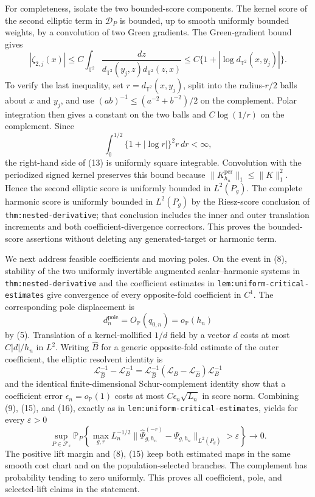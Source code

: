 For completeness, isolate the two bounded-score components.  The kernel score of the second elliptic term in \(\mathcal D_P\) is bounded, up to smooth uniformly bounded weights, by a convolution of two Green gradients.  The Green-gradient bound gives
\[
 |\zeta_{2,j}(x)|
 \leq C\int_{\mathbb T^2}
 \frac{dz}{d_{\mathbb T^2}(y_j,z)d_{\mathbb T^2}(z,x)}
 \leq C\{1+|\log d_{\mathbb T^2}(x,y_j)|\}.
\tag{13}
\]
To verify the last inequality, set \(r=d_{\mathbb T^2}(x,y_j)\), split into the radius-\(r/2\) balls about \(x\) and \(y_j\), and use
\((ab)^{-1}\leq(a^{-2}+b^{-2})/2\) on the complement.  Polar integration then gives a constant on the two balls and \(C\log(1/r)\) on the complement.  Since
\[
 \int_0^{1/2}\{1+|\log r|\}^2r\,dr<\infty,
\tag{14}
\]
the right-hand side of (13) is uniformly square integrable.  Convolution with the periodized signed kernel preserves this bound because
\(\lVert K_{h_n}^{\mathrm{per}}\rVert_1\leq\lVert K\rVert_1^2\).  Hence the second elliptic score is uniformly bounded in \(L^2(P_g)\).  The complete harmonic score is uniformly bounded in \(L^2(P_g)\) by the Riesz-score conclusion of
\texttt{thm:nested-derivative}; that conclusion includes the inner and outer translation increments and both coefficient-divergence correctors.  This proves the bounded-score assertions without deleting any generated-target or harmonic term.

We next address feasible coefficients and moving poles.  On the event in (8), stability of the two uniformly invertible augmented scalar--harmonic systems in
\texttt{thm:nested-derivative} and the coefficient estimates in
\texttt{lem:uniform-critical-estimates} give convergence of every opposite-fold coefficient in \(C^1\).  The corresponding pole displacement is
\[
 d_n^{\mathrm{pole}}=O_{\mathbb P}(q_{0,n})=o_{\mathbb P}(h_n)
\tag{15}
\]
by (5).  Translation of a kernel-mollified \(1/d\) field by a vector \(d\) costs at most \(C|d|/h_n\) in \(L^2\).  Writing \(\widehat B\) for a generic opposite-fold estimate of the outer coefficient, the elliptic resolvent identity is
\[
 \mathcal L_{\widehat B}^{-1}-\mathcal L_B^{-1}
 =\mathcal L_{\widehat B}^{-1}
   (\mathcal L_B-\mathcal L_{\widehat B})\mathcal L_B^{-1}
\tag{16}
\]
and the identical finite-dimensional Schur-complement identity show that a coefficient error \(\epsilon_n=o_{\mathbb P}(1)\) costs at most
\(C\epsilon_n\sqrt{L_n}\) in score norm.  Combining (9), (15), and (16), exactly as in
\texttt{lem:uniform-critical-estimates}, yields for every \(\varepsilon>0\)
\[
 \sup_{P\in\mathcal F_s}\mathbb P_P\!\left\{
 \max_{g,r}L_n^{-1/2}
 \lVert\widehat\Psi_{g,h_n}^{(-r)}-\Psi_{g,h_n}\rVert_{L^2(P_g)}
 >\varepsilon\right\}\longrightarrow0.
\tag{17}
\]
The positive lift margin and (8), (15) keep both estimated maps in the same smooth cost chart and on the population-selected branches.  The complement has probability tending to zero uniformly.  This proves all coefficient, pole, and selected-lift claims in the statement.


